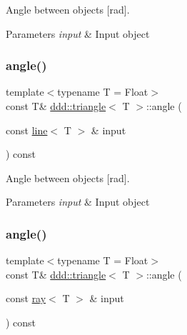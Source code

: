 Angle between objects \mbox{[}rad\mbox{]}. 


\begin{DoxyParams}{Parameters}
{\em input} & Input object \\
\hline
\end{DoxyParams}
\mbox{\label{classddd_1_1triangle_a98946234d7e985c3a22f74467e7c4467}} 
\subsubsection{\texorpdfstring{angle()}{angle()}\hspace{0.1cm}{\footnotesize\ttfamily [2/5]}}
{\footnotesize\ttfamily template$<$typename T = Float$>$ \\
const T\& \hyperlink{classddd_1_1triangle}{ddd\+::triangle}$<$ T $>$\+::angle (\begin{DoxyParamCaption}\item[{const \hyperlink{classddd_1_1line}{line}$<$ T $>$ \&}]{input }\end{DoxyParamCaption}) const\hspace{0.3cm}{\ttfamily [inline]}}



Angle between objects \mbox{[}rad\mbox{]}. 


\begin{DoxyParams}{Parameters}
{\em input} & Input object \\
\hline
\end{DoxyParams}
\mbox{\label{classddd_1_1triangle_a47d6182945cca395be1b9f6f387694b9}} 
\subsubsection{\texorpdfstring{angle()}{angle()}\hspace{0.1cm}{\footnotesize\ttfamily [3/5]}}
{\footnotesize\ttfamily template$<$typename T = Float$>$ \\
const T\& \hyperlink{classddd_1_1triangle}{ddd\+::triangle}$<$ T $>$\+::angle (\begin{DoxyParamCaption}\item[{const \hyperlink{classddd_1_1ray}{ray}$<$ T $>$ \&}]{input }\end{DoxyParamCaption}) const\hspace{0.3cm}{\ttfamily [inline]}}



